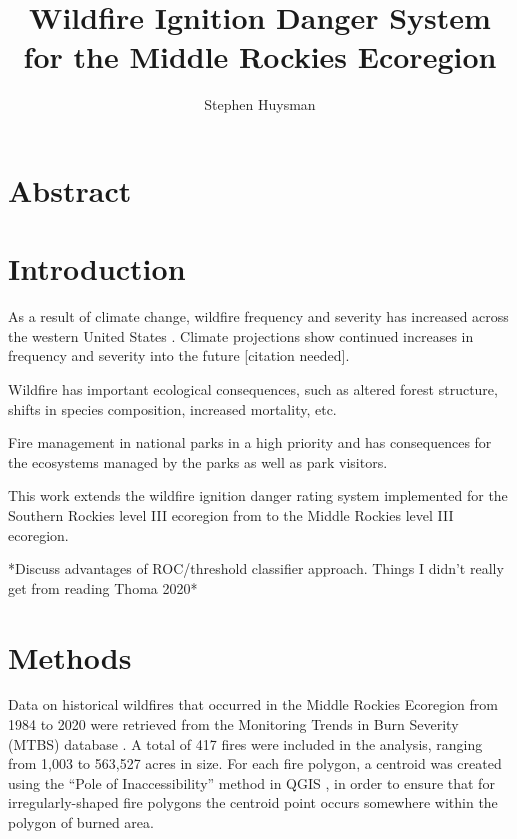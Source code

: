 \documentclass{article}
\author{Stephen Huysman}
\title{Wildfire Ignition Danger System for the Middle Rockies Ecoregion}
\begin{document}
\maketitle


\section{Abstract}

\section{Introduction}

As a result of climate change, wildfire frequency and severity has increased across the western United States \citep{rileyRelationshipLargeFire2013a}.  Climate projections show continued increases in frequency and severity into the future [citation needed].

Wildfire has important ecological consequences, such as altered forest structure, shifts in species composition, increased mortality, etc.

Fire management in national parks in a high priority and has consequences for the ecosystems managed by the parks as well as park visitors.

This work extends the wildfire ignition danger rating system implemented for the Southern Rockies level III ecoregion \citep{omernikEcoregionsConterminousUnited1987} from \citet{thomaWaterBalanceIndicator2020} to the Middle Rockies level III ecoregion.  

*Discuss advantages of ROC/threshold classifier approach.  Things I didn't really get from reading Thoma 2020*

\section{Methods}

Data on historical wildfires that occurred in the Middle Rockies Ecoregion from 1984 to 2020 were retrieved from the Monitoring Trends in Burn Severity (MTBS) database \citep{eidenshinkProjectMonitoringTrends2007}.  A total of 417 fires were included in the analysis, ranging from 1,003 to 563,527 acres in size.  For each fire polygon, a centroid was created using the ``Pole of Inaccessibility'' method in QGIS \citep{QGIS_software}, in order to ensure that for irregularly-shaped fire polygons the centroid point occurs somewhere within the polygon of burned area.  
\end{document}
